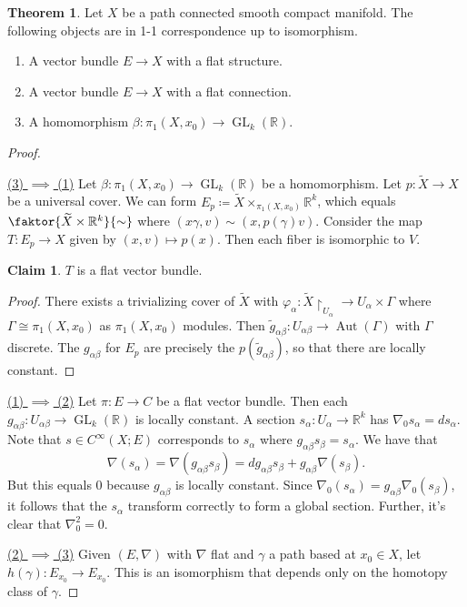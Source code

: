 \documentclass[10pt,letterpaper,cm]{nupset}
\theoremstyle{definition}
\theoremstyle{theorem}
\newtheorem{theorem}[definition]{Theorem}
\newtheorem*{claim}{Claim}
\theoremstyle{remark}
\newcommand{\R}{\mathbb{R}}
\newcommand{\1}{\mathbb{1}}
\newcommand{\0}{\vec 0}
\DeclareMathOperator{\GL}{GL}
\DeclareMathOperator{\aut}{Aut}
\begin{document}
\begin{theorem}
Let $X$ be a path connected smooth compact manifold. The following objects are in 1-1 correspondence up to isomorphism.
\begin{enumerate}[label=(\arabic*)]
\item A vector bundle $E \to X$ with a flat structure.
\item A vector bundle $E \to X$ with a flat connection.
\item A homomorphism $\beta : \pi_1\left(X, x_0\right) \to \GL_k(\R)$.
\end{enumerate}
\end{theorem}
\begin{proof} $ $
\smallskip

\underline{(3) $\implies$ (1)} Let $\beta : \pi_1\left(X, x_0\right) \to \GL_k(\R)$ be a homomorphism. Let $p : \widetilde{X} \to X$ be a universal cover. We can form $E_p \coloneqq  \widetilde{X} \times_{\pi_1\left(X, x_0\right)} \R^k$, which equals $\faktor{\widetilde{X} \times \R^k}{\sim}$ where $\left(x{\gamma}, v\right) \sim \left(x, p(\gamma)v\right)$.  Consider the map $T: E_p \to X$ given by $\left(x,v\right) \mapsto p(x)$. Then each fiber is isomorphic to $V$.
\begin{claim}
$T$ is a flat vector bundle.
\end{claim}
\begin{proof}
There exists a trivializing cover of $\widetilde{X}$ with $\varphi_{\alpha} : \widetilde{X}\restriction_{U_{\alpha}} \to U_{\alpha} \times \Gamma$ where $\Gamma \cong \pi_1\left(X, x_0\right)$ as $\pi_1\left(X, x_0\right)$ modules. Then $\tilde{g}_{\alpha{\beta}} : U_{\alpha{\beta}} \to \aut(\Gamma)$ with $\Gamma$ discrete. The $g_{\alpha{\beta}}$ for $E_p$ are precisely the $p(\tilde{g}_{\alpha{\beta}})$, so that there are locally constant. 
\end{proof}
\underline{(1) $\implies$ (2)} Let $\pi : E \to C$ be a flat vector bundle. Then each $g_{\alpha{\beta}} : U_{\alpha{\beta}} \to \GL_k(\R)$  is locally constant. A section  $s_{\alpha} : U_{\alpha} \to \R^k$ has $\nabla_0{s_{\alpha}} = ds_{\alpha}$. Note that $s \in C^{\infty}(X; E)$ corresponds to $s_{\alpha}$ where $g_{\alpha{\beta}}s_{\beta} = s_{\alpha}$. We have that $$ \nabla(s_{\alpha}) = \nabla(g_{\alpha{\beta}}s_{\beta}) = dg_{\alpha{\beta}} s_{\beta} + g_{\alpha{\beta}}\nabla(s_{\beta})    .$$ But this equals $0$ because $g_{\alpha{\beta}}$ is locally constant. Since $\nabla_0(s_{\alpha}) = g_{\alpha{\beta}} \nabla_0(s_{\beta})$, it follows that the $s_{\alpha}$  transform correctly to form a global section. Further, it's clear that $\nabla_0^2 =0$. 

\underline{(2) $\implies$ (3)} Given $\left(E, \nabla\right)$ with $\nabla$ flat and $\gamma$ a path based at $x_0 \in X$, let $h(\gamma) : E_{x_0} \to E_{x_0}$. This is an isomorphism that depends only on the homotopy class of $\gamma$.
\end{proof}
\end{document}
